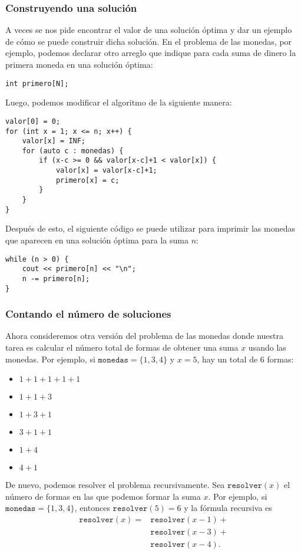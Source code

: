 \subsubsection{Construyendo una solución}

A veces se nos pide encontrar el valor
de una solución óptima y dar
un ejemplo de cómo se puede construir dicha solución.
En el problema de las monedas, por ejemplo,
podemos declarar otro arreglo
que indique para
cada suma de dinero la primera moneda
en una solución óptima:
\begin{lstlisting}
int primero[N];
\end{lstlisting}
Luego, podemos modificar el algoritmo de la siguiente manera:
\begin{lstlisting}
valor[0] = 0;
for (int x = 1; x <= n; x++) {
    valor[x] = INF;
    for (auto c : monedas) {
        if (x-c >= 0 && valor[x-c]+1 < valor[x]) {
            valor[x] = valor[x-c]+1;
            primero[x] = c;
        }
    }
}
\end{lstlisting}
Después de esto, el siguiente código se puede utilizar para
imprimir las monedas que aparecen en una solución óptima para
la suma $n$:
\begin{lstlisting}
while (n > 0) {
    cout << primero[n] << "\n";
    n -= primero[n];
}
\end{lstlisting}

\subsubsection{Contando el número de soluciones}

Ahora consideremos otra versión
del problema de las monedas donde nuestra tarea es
calcular el número total de formas
de obtener una suma $x$ usando las monedas.
Por ejemplo, si $\texttt{monedas}=\{1,3,4\}$ y
$x=5$, hay un total de 6 formas:

\begin{multicols}{2}
\begin{itemize}
\item $1+1+1+1+1$
\item $1+1+3$
\item $1+3+1$
\item $3+1+1$
\item $1+4$
\item $4+1$
\end{itemize}
\end{multicols}

De nuevo, podemos resolver el problema recursivamente.
Sea $\texttt{resolver}(x)$ el número de formas
en las que podemos formar la suma $x$.
Por ejemplo, si $\texttt{monedas}=\{1,3,4\}$,
entonces $\texttt{resolver}(5)=6$ y la fórmula recursiva es
\begin{equation*}
\begin{split}
\texttt{resolver}(x) = & \texttt{resolver}(x-1) + \\
                    & \texttt{resolver}(x-3) + \\
                    & \texttt{resolver}(x-4)  .
\end{split}
\end{equation*}


